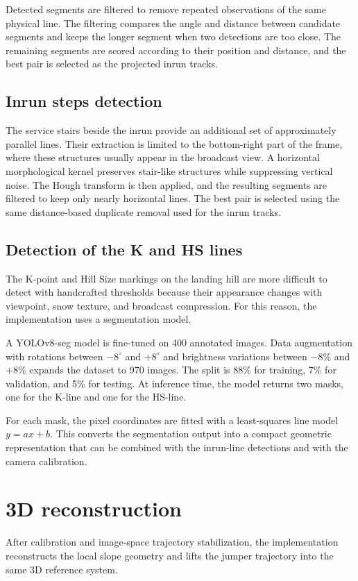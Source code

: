 Detected segments are filtered to remove repeated observations of the same physical line. The filtering compares the angle and distance between candidate segments and keeps the longer segment when two detections are too close. The remaining segments are scored according to their position and distance, and the best pair is selected as the projected inrun tracks.

\subsection{Inrun steps detection}
The service stairs beside the inrun provide an additional set of approximately parallel lines. Their extraction is limited to the bottom-right part of the frame, where these structures usually appear in the broadcast view. A horizontal morphological kernel preserves stair-like structures while suppressing vertical noise. The Hough transform is then applied, and the resulting segments are filtered to keep only nearly horizontal lines. The best pair is selected using the same distance-based duplicate removal used for the inrun tracks.

\subsection{Detection of the K and HS lines}
The K-point and Hill Size markings on the landing hill are more difficult to detect with handcrafted thresholds because their appearance changes with viewpoint, snow texture, and broadcast compression. For this reason, the implementation uses a segmentation model.

A YOLOv8-seg model is fine-tuned on 400 annotated images. Data augmentation with rotations between \(-8^\circ\) and \(+8^\circ\) and brightness variations between \(-8\%\) and \(+8\%\) expands the dataset to 970 images. The split is 88\% for training, 7\% for validation, and 5\% for testing. At inference time, the model returns two masks, one for the K-line and one for the HS-line.

For each mask, the pixel coordinates are fitted with a least-squares line model \(y = ax + b\). This converts the segmentation output into a compact geometric representation that can be combined with the inrun-line detections and with the camera calibration.

\section{3D reconstruction}
After calibration and image-space trajectory stabilization, the implementation reconstructs the local slope geometry and lifts the jumper trajectory into the same 3D reference system.

